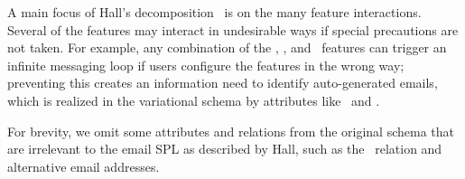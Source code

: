 A main focus of Hall's decomposition~\cite{Hall05} is on the many feature
interactions.
Several of the features may interact in
undesirable ways if special precautions are not taken. For example, any
combination of the \forwardmsg, \remailmsg, and \autoresponder\ features can
trigger an infinite messaging loop if users configure the features in the wrong
way; preventing this creates an information need to identify auto-generated
emails, which is realized in the variational schema by attributes like
\isforwardmsg\ and \isautoresponse.
%
%

%
%

%
For brevity, we omit some attributes and relations from the original schema
that are  irrelevant to the email SPL as described by Hall, such as the
\ relation and alternative email addresses. 
%



